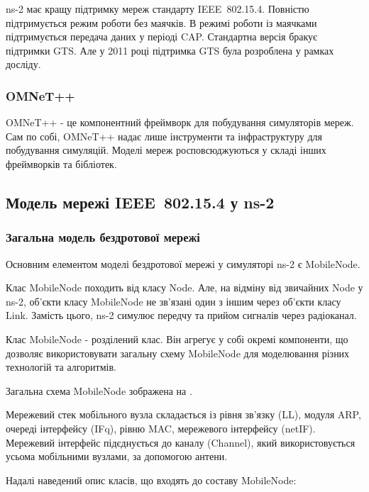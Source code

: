 \documentclass[a4paper,ukrainian,utf8,nocolumnsxix,floatsection]{eskdtext}
\renewcommand\paragraph{\subsubsection}
\newcommand{\todoi}[1]{\todo[inline]{#1}}
\newcommand{\iee}[0]{IEEE~802.15.4\xspace}
\begin{document}
ns-2 має кращу підтримку мереж стандарту \iee. Повністю підтримується режим роботи без маячків. В режимі роботи із маячками підтримується передача даних у періоді CAP. Стандартна версія бракує підтримки GTS. Але у 2011 році підтримка GTS була розроблена у рамках досліду.

\paragraph{OMNeT++}

OMNeT++ - це компонентний фреймворк для побудування симуляторів мереж. Сам по собі, OMNeT++ надає лише інструменти та інфраструктуру для побудування симуляцій. Моделі мереж росповсюджуються у складі інших фреймворків та бібліотек. 

\subsection{Модель мережі \iee у ns-2}

\paragraph{Загальна модель бездротової мережі}

Основним елементом моделі бездротової мережі у симуляторі ns-2 є MobileNode. 

Клас MobileNode походить від класу Node. Але, на відміну від звичайних Node у ns-2, об’єкти класу MobileNode не зв’язані один з іншим через об’єкти класу Link. Замість цього, ns-2 симулює передчу та прийом сигналів через радіоканал.

Клас MobileNode - розділений клас. Він агрегує у собі окремі компоненти, що дозволяє використовувати загальну схему MobileNode для моделювання різних технологій та алгоритмів. 

Загальна схема MobileNode зображена на .

\todoi{img загальна схема mobile node}

Мережевий стек мобільного вузла складається із рівня зв’язку (LL), модуля ARP, очереді інтерфейсу (IFq), рівню MAC, мережевого інтерфейсу (netIF). Мережевий інтерфейс підєднується до каналу (Channel), який використовується усьома мобільними вузлами, за допомогою антени.

Надалі наведений опис класів, що входять до составу MobileNode:
\end{document}
